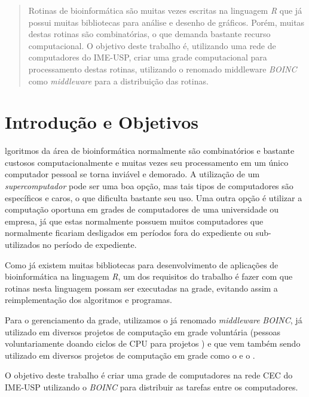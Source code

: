 \documentclass[b1]{sciposter}
\begin{document}
\begin{multicols}{2}

\begin{abstract}
Rotinas de bioinformática são muitas vezes escritas na linguagem \textit{R} que já possui
muitas bibliotecas para análise e desenho de gráficos. Porém, muitas destas rotinas são
combinatórias, o que demanda bastante recurso computacional. O objetivo deste trabalho é,
utilizando uma rede de computadores do IME-USP, criar uma grade computacional para processamento 
destas rotinas, utilizando o renomado middleware \textit{BOINC} como \textit{middleware} para
a distribuição das rotinas.

\end{abstract}

\section{Introdução e Objetivos}

lgoritmos da área de bioinformática normalmente são combinatórios e bastante custosos computacionalmente
e muitas vezes seu processamento em um único computador pessoal se torna inviável e demorado. A utilização de um 
\textit{supercomputador} pode ser uma boa opção, mas tais tipos de computadores são específicos e caros, o que 
dificulta bastante seu uso. Uma outra opção é utilizar a computação oportuna em grades de computadores de 
uma universidade ou empresa, já que estas normalmente possuem muitos computadores que normalmente ficariam desligados
 em períodos fora do expediente ou sub-utilizados no período de expediente. 

Como já existem muitas bibliotecas para desenvolvimento de aplicações de bioinformática na linguagem \textit{R}, um dos
requisitos do trabalho é fazer com que rotinas nesta linguagem possam ser executadas na grade, evitando assim 
a reimplementação dos algoritmos e programas. 

Para o gerenciamento da grade, utilizamos o já renomado \textit{middleware} \emph{BOINC}, já utilizado em diversos projetos
de computação em grade voluntária (pessoas voluntariamente doando ciclos de CPU para projetos ) e que vem também sendo utilizado
em diversos projetos de computação em grade como o %
e o %
.

O objetivo deste trabalho é criar uma grade de computadores na rede CEC do IME-USP utilizando o \textit{BOINC} para distribuir as tarefas
entre os computadores.





\end{multicols}
\end{document}
